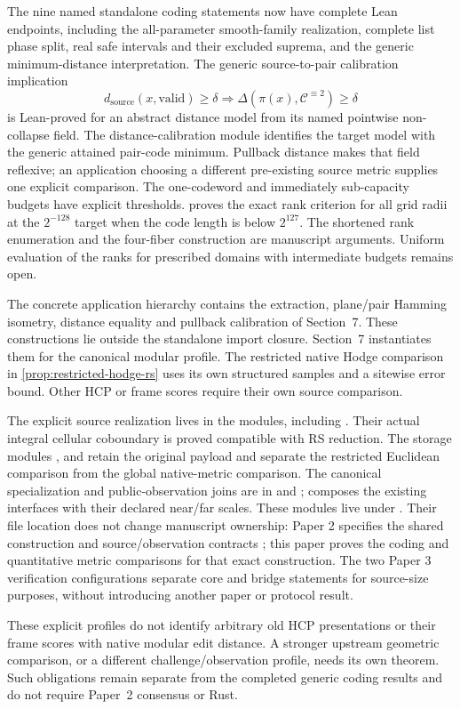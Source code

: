 The nine named standalone coding statements now have complete Lean
endpoints, including the all-parameter smooth-family realization, complete
list phase split, real safe intervals and their excluded suprema, and the
generic minimum-distance interpretation. The generic source-to-pair calibration implication
\[
  d_{\mathrm{source}}(x,\mathrm{valid})\ge\delta
  \Longrightarrow
  \Delta(\pi(x),\mathcal C^{\equiv2})\ge\delta
\]
is Lean-proved for an abstract distance model from its named pointwise
non-collapse field. The distance-calibration module identifies the target
model with the generic attained pair-code minimum. Pullback distance
makes that field reflexive; an application choosing a different pre-existing
source metric supplies one explicit comparison.
The one-codeword and immediately sub-capacity budgets have explicit
thresholds.  proves the exact rank criterion
for all grid radii at the \(2^{-128}\) target when the code length is
below \(2^{127}\). The shortened rank enumeration and the four-fiber
construction are manuscript arguments. Uniform evaluation of the ranks
for prescribed domains with intermediate budgets remains open.

The concrete application hierarchy contains the extraction, plane/pair
Hamming isometry, distance equality and pullback calibration of Section~7.
These constructions lie outside the standalone 
import closure. Section~7 instantiates them for the canonical modular
profile. The restricted native Hodge comparison in
\cref{prop:restricted-hodge-rs} uses its own structured samples and a
sitewise error bound. Other HCP or frame scores require their own
source comparison.

The explicit source realization lives in the 
modules, including . Their actual integral cellular coboundary
is proved compatible with RS reduction. The storage modules
,  and 
retain the original payload and separate the restricted Euclidean comparison
from the global native-metric comparison. The canonical specialization and
public-observation joins are in  and
;  composes the existing
interfaces with their declared near/far scales. These modules live under
. Their file location does not change manuscript
ownership: Paper 2 specifies the shared construction and source/observation
contracts \cite{vanDerVlugt2026protocol}; this paper proves the coding and
quantitative metric comparisons for that exact construction. The two Paper 3
verification configurations separate core and bridge statements for source-size
purposes, without introducing another paper or protocol result.

These explicit profiles do not identify arbitrary old HCP presentations or
their frame scores with native modular edit distance. A stronger upstream
geometric comparison, or a different challenge/observation profile, needs its
own theorem. Such obligations remain separate from the completed generic
coding results and do not require Paper~2 consensus or Rust.
